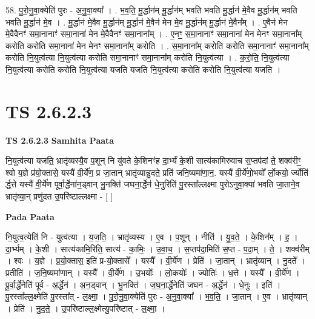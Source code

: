 \documentclass[17pt]{extarticle}
\begin{document}
58. पु॒रो॒नु॒वा॒क्येति॑ पुरः - अ॒नु॒वा॒क्या᳚ । . भ॒व॒ति॒ मू॒र्द्धान॑म् मू॒र्द्धान॑म् भवति भवति मू॒र्द्धान॑ मे॒वैव मू॒र्द्धान॑म् भवति भवति मू॒र्द्धान॑ मे॒व । . मू॒र्द्धान॑ मे॒वैव मू॒र्द्धान॑म् मू॒र्द्धान॑ मे॒वैन॑ मेन मे॒व मू॒र्द्धान॑म् मू॒र्द्धान॑ मे॒वैन᳚म् । . ए॒वैन॑ मेन मे॒वैवैनꣳ॑ समा॒नानाꣳ॑ समा॒नाना॑ मेन मे॒वैवैनꣳ॑ समा॒नाना᳚म् । . ए॒नꣳ॒॒ स॒मा॒नानाꣳ॑ समा॒नाना॑ मेन मेनꣳ समा॒नाना᳚म् करोति करोति समा॒नाना॑ मेन मेनꣳ समा॒नाना᳚म् करोति । . स॒मा॒नाना᳚म् करोति करोति समा॒नानाꣳ॑ समा॒नाना᳚म् करोति नि॒युत्व॑त्या नि॒युत्व॑त्या करोति समा॒नानाꣳ॑ समा॒नाना᳚म् करोति नि॒युत्व॑त्या । . क॒रो॒ति॒ नि॒युत्व॑त्या नि॒युत्व॑त्या करोति करोति नि॒युत्व॑त्या यजति यजति नि॒युत्व॑त्या करोति करोति नि॒युत्व॑त्या यजति । \newline
\pagebreak
{}
\section*{ TS 2.6.2.3 }

\textbf{TS 2.6.2.3 } \newline
\textbf{Samhita Paata} \newline

नि॒युत्व॑त्या यजति॒ भ्रातृ॑व्यस्यै॒व प॒शून् नि यु॑वते के॒शिनꣳ॑ह दा॒र्भ्यं के॒शी सात्य॑कामिरुवाच स॒प्तप॑दां ते॒ शक्व॑रीꣳ॒॒ श्वो य॒ज्ञे प्र॑यो॒क्तासे॒ यस्यै॑ वी॒र्ये॑ण॒ प्र जा॒तान् भ्रातृ॑व्यान्नु॒दते॒ प्रति॑ जनि॒ष्यमा॑णा॒न॒. यस्यै॑ वी॒र्ये॑णो॒भयो᳚ र्लो॒कयो॒ र्ज्योति॑ र्द्ध॒त्ते यस्यै॑ वी॒र्ये॑ण पूर्वा॒र्द्धेना॑न॒ड्वान् भु॒नक्ति॑ जघना॒र्द्धेन॑ धे॒नुरिति॑ पु॒रस्ता᳚ल्लक्ष्मा पुरोऽनुवा॒क्या॑ भवति जा॒ताने॒व भ्रातृ॑व्या॒न् प्रणु॑दत उ॒परि॑ष्टाल्लक्ष्मा - [  ] \newline

\textbf{Pada Paata} \newline

नि॒युत्व॒त्येति॑ नि - युत्व॑त्या । य॒ज॒ति॒ । भ्रातृ॑व्यस्य । ए॒व । प॒शून् । नीति॑ । यु॒व॒ते॒ । के॒शिन᳚म् । ह॒ । दा॒र्भ्यम् । के॒शी । सात्य॑कामि॒रिति॒ सात्य॑ - का॒मिः॒ । उ॒वा॒च॒ । स॒प्तप॑दा॒मिति॑ स॒प्त - प॒दा॒म् । ते॒ । शक्व॑रीम् । श्वः । य॒ज्ञे । प्र॒यो॒क्तास॒ इति॑ प्र-यो॒क्तासे᳚ । यस्यै᳚ । वी॒र्ये॑ण । प्रेति॑ । जा॒तान् । भ्रातृ॑व्यान् । नु॒दते᳚ । प्रतीति॑ । ज॒नि॒ष्यमा॑णान् । यस्यै᳚ । वी॒र्ये॑ण । उ॒भयोः᳚ । लो॒कयोः᳚ । ज्योतिः॑ । ध॒त्ते । यस्यै᳚ । वी॒र्ये॑ण । पू॒र्वा॒र्द्धेनेति॑ पूर्व - अ॒र्द्धेन॑ । अ॒न॒ड्वान् । भु॒नक्ति॑ । ज॒घ॒ना॒र्द्धेनेति॑ जघन - अ॒र्द्धेन॑ । धे॒नुः । इति॑ । पु॒रस्ता᳚ल्ल॒क्ष्मेति॑ पु॒रस्ता᳚त् - ल॒क्ष्मा॒ । पु॒रो॒नु॒वा॒क्येति॑ पुरः - अ॒नु॒वा॒क्या᳚ । भ॒व॒ति॒ । जा॒तान् । ए॒व । भ्रातृ॑व्यान् । प्रेति॑ । नु॒द॒ते॒ । उ॒परि॑ष्टाल्ल॒क्ष्मेत्यु॒परि॑ष्टात् - ल॒क्ष्मा॒ ।  \newline
\end{document}
